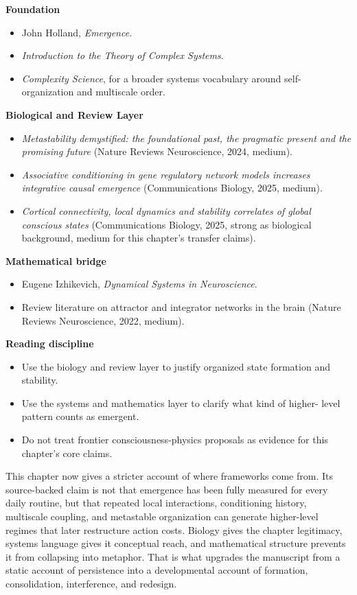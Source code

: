 \begin{readingbox}
\textbf{Foundation}
\begin{itemize}[nosep]
  \item John Holland, \emph{Emergence}.
  \item \emph{Introduction to the Theory of Complex Systems}.
  \item \emph{Complexity Science}, for a broader systems vocabulary around
        self-organization and multiscale order.
\end{itemize}
\textbf{Biological and Review Layer}
\begin{itemize}[nosep]
  \item \emph{Metastability demystified: the foundational past, the pragmatic
        present and the promising future} (Nature Reviews Neuroscience, 2024,
        medium).
  \item \emph{Associative conditioning in gene regulatory network models
        increases integrative causal emergence} (Communications Biology, 2025,
        medium).
  \item \emph{Cortical connectivity, local dynamics and stability correlates of
        global conscious states} (Communications Biology, 2025, strong as
        biological background, medium for this chapter's transfer claims).
\end{itemize}
\textbf{Mathematical bridge}
\begin{itemize}[nosep]
  \item Eugene Izhikevich, \emph{Dynamical Systems in Neuroscience}.
  \item Review literature on attractor and integrator networks in the brain
        (Nature Reviews Neuroscience, 2022, medium).
\end{itemize}
\textbf{Reading discipline}
\begin{itemize}[nosep]
  \item Use the biology and review layer to justify organized state formation
        and stability.
  \item Use the systems and mathematics layer to clarify what kind of higher-
        level pattern counts as emergent.
  \item Do not treat frontier consciousness-physics proposals as evidence for
        this chapter's core claims.
\end{itemize}
\end{readingbox}

\begin{summarybox}
This chapter now gives a stricter account of where frameworks come from. Its
source-backed claim is not that emergence has been fully measured for every
daily routine, but that repeated local interactions, conditioning history,
multiscale coupling, and metastable organization can generate higher-level
regimes that later restructure action costs. Biology gives the chapter
legitimacy, systems language gives it conceptual reach, and mathematical
structure prevents it from collapsing into metaphor. That is what upgrades the
manuscript from a static account of persistence into a developmental account of
formation, consolidation, interference, and redesign.
\end{summarybox}
